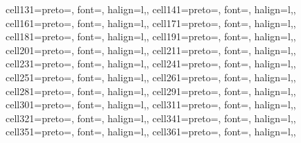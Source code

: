 \documentclass[
  12pt,
  letterpaper,
]{article}
\begin{document}
\begin{table}
{\begin{tblr}[         %
]
{cell{13}{1}={}{preto={\hspace{2em}}, font=\fontsize{0.8em}{1.1em}\selectfont, halign=l,},
cell{14}{1}={}{preto={\hspace{2em}}, font=\fontsize{0.8em}{1.1em}\selectfont, halign=l,},
cell{16}{1}={}{preto={\hspace{2em}}, font=\fontsize{0.8em}{1.1em}\selectfont, halign=l,},
cell{17}{1}={}{preto={\hspace{2em}}, font=\fontsize{0.8em}{1.1em}\selectfont, halign=l,},
cell{18}{1}={}{preto={\hspace{2em}}, font=\fontsize{0.8em}{1.1em}\selectfont, halign=l,},
cell{19}{1}={}{preto={\hspace{2em}}, font=\fontsize{0.8em}{1.1em}\selectfont, halign=l,},
cell{20}{1}={}{preto={\hspace{2em}}, font=\fontsize{0.8em}{1.1em}\selectfont, halign=l,},
cell{21}{1}={}{preto={\hspace{2em}}, font=\fontsize{0.8em}{1.1em}\selectfont, halign=l,},
cell{23}{1}={}{preto={\hspace{2em}}, font=\fontsize{0.8em}{1.1em}\selectfont, halign=l,},
cell{24}{1}={}{preto={\hspace{2em}}, font=\fontsize{0.8em}{1.1em}\selectfont, halign=l,},
cell{25}{1}={}{preto={\hspace{2em}}, font=\fontsize{0.8em}{1.1em}\selectfont, halign=l,},
cell{26}{1}={}{preto={\hspace{2em}}, font=\fontsize{0.8em}{1.1em}\selectfont, halign=l,},
cell{28}{1}={}{preto={\hspace{2em}}, font=\fontsize{0.8em}{1.1em}\selectfont, halign=l,},
cell{29}{1}={}{preto={\hspace{2em}}, font=\fontsize{0.8em}{1.1em}\selectfont, halign=l,},
cell{30}{1}={}{preto={\hspace{2em}}, font=\fontsize{0.8em}{1.1em}\selectfont, halign=l,},
cell{31}{1}={}{preto={\hspace{2em}}, font=\fontsize{0.8em}{1.1em}\selectfont, halign=l,},
cell{32}{1}={}{preto={\hspace{2em}}, font=\fontsize{0.8em}{1.1em}\selectfont, halign=l,},
cell{34}{1}={}{preto={\hspace{2em}}, font=\fontsize{0.8em}{1.1em}\selectfont, halign=l,},
cell{35}{1}={}{preto={\hspace{2em}}, font=\fontsize{0.8em}{1.1em}\selectfont, halign=l,},
cell{36}{1}={}{preto={\hspace{2em}}, font=\fontsize{0.8em}{1.1em}\selectfont, halign=l,},
}
\end{tblr}}
\end{table}
\end{document}
